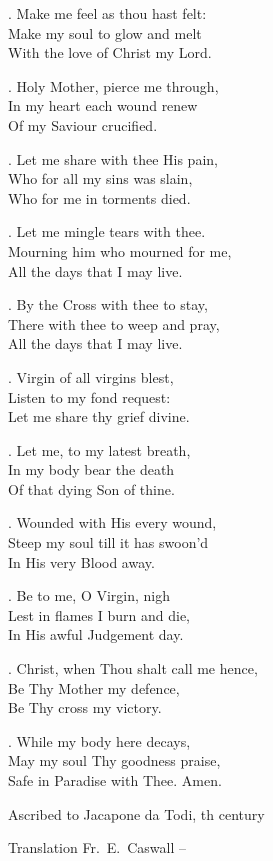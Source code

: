 {{\itlyrics

. Make me feel as thou hast felt:\\
Make my soul to glow and melt\\
With the love of Christ my Lord.

. Holy Mother, pierce me through,\\
In my heart each wound renew\\
Of my Saviour crucified.

. Let me share with thee His pain,\\
Who for all my sins was slain,\\
Who for me in torments died.

. Let me mingle tears with thee.\\
Mourning him who mourned for me,\\
All the days that I may live.

. By the Cross with thee to stay,\\
There with thee to weep and pray,\\
All the days that I may live.

. Virgin of all virgins blest,\\
Listen to my fond request:\\
Let me share thy grief divine.

. Let me, to my latest breath,\\
In my body bear the death\\
Of that dying Son of thine.

. Wounded with His every wound,\\
Steep my soul till it has swoon'd\\
In His very Blood away.

. Be to me, O Virgin, nigh\\
Lest in  flames I burn and die,\\
In His awful Judgement day.

. Christ, when Thou shalt call me hence,\\
Be Thy Mother my defence,\\
Be Thy cross my victory.

. While my body here decays,\\
May my soul Thy goodness praise,\\
Safe in Paradise with Thee. Amen.


}
}

\medskip

\source Ascribed to Jacapone da Todi, {}th century

\source Translation Fr.~E.~Caswall {}--{}

\endlyrics


